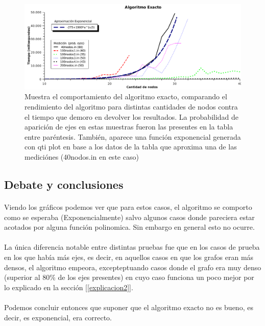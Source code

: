 \begin{figure}[h]
    \begin{minipage}{\textwidth}
	\begin{center}
		\includegraphics[width=\textwidth]{./otros/graficos/tiempo_ej2.pdf}
		\caption{Muestra el comportamiento del algoritmo exacto, comparando el rendimiento del algoritmo para distintas cantidades de nodos contra el tiempo que demoro en devolver los resultados. La probabilidad de aparición de ejes en estas muestras fueron las presentes en la tabla entre paréntesis. También, aparece una función exponencial generada con qti plot en base a los datos de la tabla que aproxima una de las mediciónes (40nodos.in en este caso)}
		\label{ej2contarTiempo}
	\end{center}
    \end{minipage}

\end{figure}


\subsection{Debate y conclusiones}
\paragraph{}
Viendo los gráficos podemos ver que para estos casos, el algoritmo se comporto como se esperaba (Exponencialmente) salvo algunos casos donde pareciera estar acotados por alguna función polinomica. Sin embargo en general esto no ocurre.

\paragraph{}
La única diferencia notable entre distintas pruebas fue que en los casos de prueba en los que había más ejes, es decir, en aquellos casos en que los grafos eran más densos, el algoritmo empeora, excepteptuando casos donde el grafo era muy denso (superior al 80\% de los ejes presentes) en cuyo caso funciona un poco mejor por lo explicado en la sección [\ref{explicacion2}].

\paragraph{}
Podemos concluir entonces que suponer que el algoritmo exacto no es bueno, es decir, es exponencial, era correcto.




